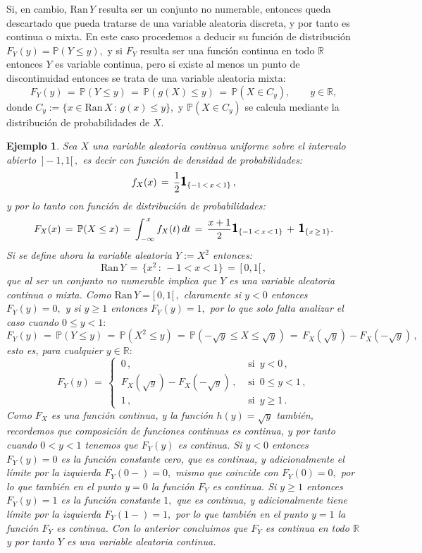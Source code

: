 \documentclass[spanish,10pt,letterpaper]{article}
\newtheorem{ejem}{Ejemplo}
\newcommand{\prob}{\mathbb{P}}
\newcommand{\Runo}{\mathbb{R}}
\newcommand{\indic}{\textbf{\textsf{\large{1}}}}
\begin{document}
Si, en cambio, $\text{Ran}\,Y$ resulta ser un conjunto no numerable, entonces queda descartado que pueda tratarse de una variable aleatoria discreta, y por tanto es continua o mixta. En este caso procedemos a deducir su función de distribución $F_Y(y)=\prob(Y\leq y),$ y si $F_Y$ resulta ser una función continua en todo $\Runo$ entonces $Y$ es variable continua, pero si existe al menos un punto de discontinuidad entonces se trata de una variable aleatoria mixta:
$$F_Y(y) \,=\, \prob(Y\leq y) \,=\, \prob(g(X)\leq y) \,=\, \prob(X\in C_y), \qquad y\in\Runo,$$
donde $C_y:=\{x\in\text{Ran}\,X\,:\,g(x)\leq y\},$ y $\prob(X\in C_y)$ se calcula mediante la distribución de probabilidades de $X.$

\bigskip

\begin{ejem}\label{ej:contdis}
    Sea $X$ una variable aleatoria continua uniforme sobre el intervalo abierto $\,]-1,1[\,,$ es decir con función de densidad de probabilidades: 
    $$f_X(x) \,=\, \frac{1}{2}\indic_{\{-1\,<\,x\,<\,1\}}\,,$$
    y por lo tanto con función de distribución de probabilidades:
    $$F_X(x) \,=\, \prob(X\leq x) \,=\, \int_{-\infty}^{\,x}f_X(t)\,dt \,=\, \frac{x+1}{2}\indic_{\{-1\,<\,x\,<\,1\}} \,+\, \indic_{\{x\,\geq\,1\}}.$$
    Si se define ahora la variable aleatoria $Y:=X^2$ entonces:
    $$\text{Ran}\,Y \,=\, \{x^2\,:\,-1<x<1\} \,=\,[\,0,1[\,,$$
    que al ser un conjunto no numerable implica que $Y$ es una variable aleatoria continua o mixta. Como $\text{Ran}\,Y=[\,0,1[\,,$ claramente si $y<0$ entonces $F_Y(y)=0,$ y si $y\geq 1$ entonces $F_Y(y)=1,$ por lo que solo falta analizar el caso cuando $0\leq y<1:$
    $$F_Y(y) \,=\, \prob(Y\leq y) \,=\, \prob(X^2\leq y) \,=\, \prob(-\sqrt{y}\leq X\leq\sqrt{y}) \,=\, F_X(\sqrt{y})-F_X(-\sqrt{y})\,,$$
    esto es, para cualquier $y\in\Runo:$
    $$F_Y(y) \,=\, \begin{cases} 
                        \,0\,, & \text{ si } \,y <0\,, \\
                        \,F_X(\sqrt{y})-F_X(-\sqrt{y})\,, & \text{ si }\, 0\leq y < 1\,, \\
                        \,1\,, & \text{ si }\, y\geq 1\,.
    \end{cases}$$
    Como $F_X$ es una función continua, y la función $h(y)=\sqrt{y}$ también, recordemos que composición de funciones continuas es continua, y por tanto cuando $0<y<1$ tenemos que $F_Y(y)$ es continua. Si $y<0$ entonces $F_Y(y)=0$ es la función constante cero, que es continua, y adicionalmente el límite por la izquierda $F_Y(0-)=0,$ mismo que coincide con $F_Y(0)=0,$ por lo que también en el punto $y=0$ la función $F_Y$ es continua. Si $y\geq 1$ entonces $F_Y(y)=1$ es la función constante $1,$ que es continua, y adicionalmente tiene límite por la izquierda $F_Y(1-)=1,$ por lo que también en el punto $y=1$ la función $F_Y$ es continua. Con lo anterior concluimos que $F_Y$ es continua en todo $\Runo$ y por tanto $Y$ es una variable aleatoria continua. \par\smallskip 


\end{ejem}
\end{document}
